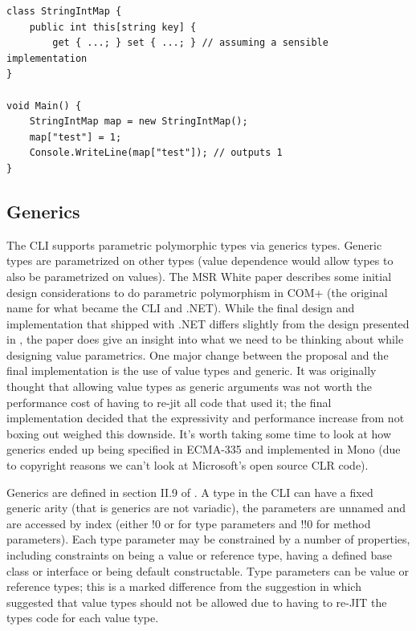 \documentclass[english]{report}
\begin{document}
\begin{lstlisting}[keywordstyle={\color{blue}},language=sharpc]
class StringIntMap {
	public int this[string key] { 
		get { ...; } set { ...; } // assuming a sensible implementation
}

void Main() {
	StringIntMap map = new StringIntMap();
	map["test"] = 1;
	Console.WriteLine(map["test"]); // outputs 1
}
\end{lstlisting}



\subsection{Generics}

The CLI supports parametric polymorphic types via generics types.
Generic types are parametrized on other types (value dependence would
allow types to also be parametrized on values). The MSR White paper
\cite{ext-vox} describes some initial design considerations to do
parametric polymorphism in COM+ (the original name for what became
the CLI and .NET). While the final design and implementation that
shipped with .NET differs slightly from the design presented in \cite{ext-vox},
the paper does give an insight into what we need to be thinking about
while designing value parametrics. One major change between the proposal
and the final implementation is the use of value types and generic.
It was originally thought that allowing value types as generic arguments
was not worth the performance cost of having to re-jit all code that
used it; the final implementation decided that the expressivity and
performance increase from not boxing out weighed this downside. It's
worth taking some time to look at how generics ended up being specified
in ECMA-335\cite{ecma-335} and implemented in Mono (due to copyright
reasons we can't look at Microsoft\textquoteright{}s open source CLR
code). 

Generics are defined in section II.9 of \cite{ecma-335}. A type in
the CLI can have a fixed generic arity (that is generics are not variadic),
the parameters are unnamed and are accessed by index (either !0 or
for type parameters and !!0 for method parameters). Each type parameter
may be constrained by a number of properties, including constraints
on being a value or reference type, having a defined base class or
interface or being default constructable. Type parameters can be value
or reference types; this is a marked difference from the suggestion
in \cite{ext-vox} which suggested that value types should not be
allowed due to having to re-JIT the types code for each value type.
\end{document}
